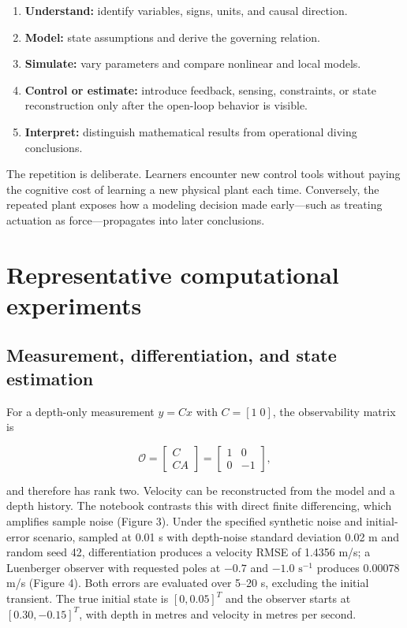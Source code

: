\documentclass[
]{article}
\providecommand{\tightlist}{%
  \setlength{\itemsep}{0pt}\setlength{\parskip}{0pt}}
\begin{document}
\begin{enumerate}
\def\labelenumi{\arabic{enumi}.}
\tightlist
\item
  \textbf{Understand:} identify variables, signs, units, and causal
  direction.
\item
  \textbf{Model:} state assumptions and derive the governing relation.
\item
  \textbf{Simulate:} vary parameters and compare nonlinear and local
  models.
\item
  \textbf{Control or estimate:} introduce feedback, sensing,
  constraints, or state reconstruction only after the open-loop behavior
  is visible.
\item
  \textbf{Interpret:} distinguish mathematical results from operational
  diving conclusions.
\end{enumerate}

The repetition is deliberate. Learners encounter new control tools
without paying the cognitive cost of learning a new physical plant each
time. Conversely, the repeated plant exposes how a modeling decision
made early---such as treating actuation as force---propagates into later
conclusions.

\hypertarget{representative-computational-experiments}{%
\section{Representative computational
experiments}\label{representative-computational-experiments}}

\hypertarget{measurement-differentiation-and-state-estimation}{%
\subsection{Measurement, differentiation, and state
estimation}\label{measurement-differentiation-and-state-estimation}}

For a depth-only measurement \(y=Cx\) with \(C=[1\;0]\), the
observability matrix is

\[
\mathcal O=\begin{bmatrix}C\\CA\end{bmatrix}
=\begin{bmatrix}1&0\\0&-1\end{bmatrix},
\]

and therefore has rank two. Velocity can be reconstructed from the model
and a depth history. The notebook contrasts this with direct finite
differencing, which amplifies sample noise (Figure 3). Under the
specified synthetic noise and initial-error scenario, sampled at 0.01 s
with depth-noise standard deviation 0.02 m and random seed 42,
differentiation produces a velocity RMSE of 1.4356 m/s; a Luenberger
observer with requested poles at \(-0.7\) and \(-1.0\)
\(\mathrm{s^{-1}}\) produces 0.00078 m/s (Figure 4). Both errors are
evaluated over 5--20 s, excluding the initial transient. The true
initial state is \([0,0.05]^T\) and the observer starts at
\([0.30,-0.15]^T\), with depth in metres and velocity in metres per
second.
\end{document}
